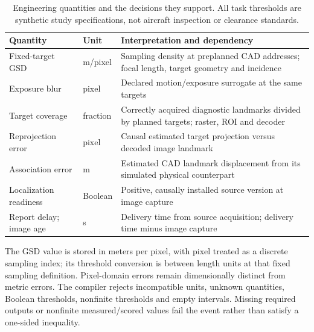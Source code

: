 \begin{table}[t]\centering\small
\caption{Engineering quantities and the decisions they support. All task thresholds are synthetic study specifications, not aircraft inspection or clearance standards.}\label{tab:r9-quantities}
\begin{tabularx}{\linewidth}{@{}l l X@{}}\toprule
Quantity & Unit & Interpretation and dependency\\\midrule
Fixed-target GSD & m/pixel & Sampling density at preplanned CAD addresses; focal length, target geometry and incidence\\
Exposure blur & pixel & Declared motion/exposure surrogate at the same targets\\
Target coverage & fraction & Correctly acquired diagnostic landmarks divided by planned targets; raster, ROI and decoder\\
Reprojection error & pixel & Causal estimated target projection versus decoded image landmark\\
Association error & m & Estimated CAD landmark displacement from its simulated physical counterpart\\
Localization readiness & Boolean & Positive, causally installed source version at image capture\\
Report delay; image age & s & Delivery time from source acquisition; delivery time minus image capture\\\bottomrule
\end{tabularx}
\end{table}
The GSD value is stored in meters per pixel, with pixel treated as a discrete sampling index; its threshold conversion is between length units at that fixed sampling definition. Pixel-domain errors remain dimensionally distinct from metric errors. The compiler rejects incompatible units, unknown quantities, Boolean thresholds, nonfinite thresholds and empty intervals. Missing required outputs or nonfinite measured/scored values fail the event rather than satisfy a one-sided inequality.

